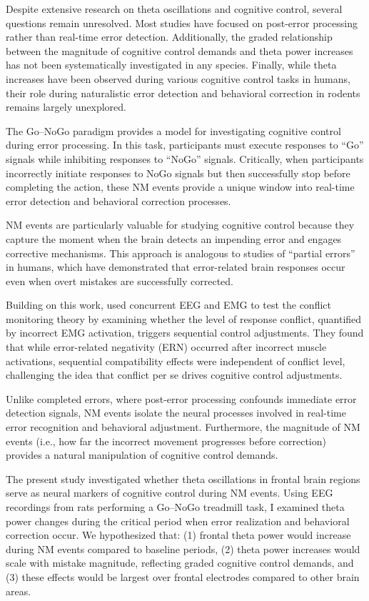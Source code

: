 \documentclass[11pt]{article}
\begin{document}
Despite extensive research on theta oscillations and cognitive control, several questions remain unresolved. Most studies have focused on post-error processing rather than real-time error detection. Additionally, the graded relationship between the magnitude of cognitive control demands and theta power increases has not been systematically investigated in any species. Finally, while theta increases have been observed during various cognitive control tasks in humans, their role during naturalistic error detection and behavioral correction in rodents remains largely unexplored.

The Go–NoGo paradigm provides a model for investigating cognitive control during error processing. In this task, participants must execute responses to ``Go'' signals while inhibiting responses to ``NoGo'' signals. Critically, when participants incorrectly initiate responses to NoGo signals but then successfully stop before completing the action, these NM events provide a unique window into real-time error detection and behavioral correction processes.

NM events are particularly valuable for studying cognitive control because they capture the moment when the brain detects an impending error and engages corrective mechanisms. This approach is analogous to studies of ``partial errors'' in humans, which have demonstrated that error-related brain responses occur even when overt mistakes are successfully corrected.

Building on this work, \citet{burle2005sequential} used concurrent EEG and EMG to test the conflict monitoring theory by examining whether the level of response conflict, quantified by incorrect EMG activation, triggers sequential control adjustments. They found that while error-related negativity (ERN) occurred after incorrect muscle activations, sequential compatibility effects were independent of conflict level, challenging the idea that conflict per se drives cognitive control adjustments.

Unlike completed errors, where post-error processing confounds immediate error detection signals, NM events isolate the neural processes involved in real-time error recognition and behavioral adjustment. Furthermore, the magnitude of NM events (i.e., how far the incorrect movement progresses before correction) provides a natural manipulation of cognitive control demands.

The present study investigated whether theta oscillations in frontal brain regions serve as neural markers of cognitive control during NM events. Using EEG recordings from rats performing a Go–NoGo treadmill task, I examined theta power changes during the critical period when error realization and behavioral correction occur. We hypothesized that: (1) frontal theta power would increase during NM events compared to baseline periods, (2) theta power increases would scale with mistake magnitude, reflecting graded cognitive control demands, and (3) these effects would be largest over frontal electrodes compared to other brain areas.
\end{document}
